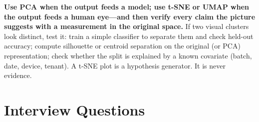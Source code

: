 \begin{keyinsight}
\textbf{Use PCA when the output feeds a model; use t-SNE or UMAP when the output feeds a human eye---and then verify every claim the picture suggests with a measurement in the original space.} If two visual clusters look distinct, test it: train a simple classifier to separate them and check held-out accuracy; compute silhouette or centroid separation on the original (or PCA) representation; check whether the split is explained by a known covariate (batch, date, device, tenant). A t-SNE plot is a hypothesis generator. It is never evidence.
\end{keyinsight}

\section{Interview Questions}
\label{cml:sec:unsupervised_interview}

